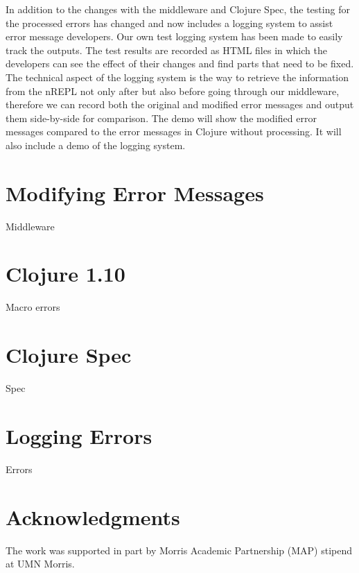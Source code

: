 \documentclass[12pt]{article}
\begin{document}
In addition to the changes with the middleware and Clojure Spec, the testing for the processed errors has changed and now includes a logging system to assist error message developers. Our own test logging system has been made to easily track the outputs. The test results are recorded as HTML files in which the developers can see the effect of their changes and find parts that need to be fixed. The technical aspect of the logging system is the way to retrieve the information from the nREPL not only after but also before going through our middleware, therefore we can record both the original and modified error messages and output them side-by-side for comparison.
The demo will show the modified error messages compared to the error messages in Clojure without processing. It will also include a demo of the logging system.

\section{Modifying Error Messages}
Middleware

\section{Clojure 1.10}
Macro errors

\section{Clojure Spec}
Spec

\section{Logging Errors}
Errors

\section{Acknowledgments}
The work was supported in part by Morris Academic Partnership (MAP) stipend at UMN Morris.

%
%
\end{document}
